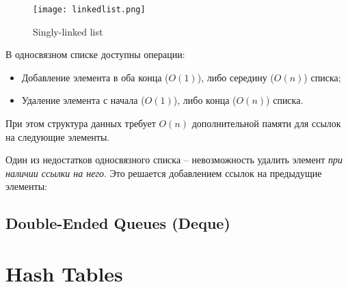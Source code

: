 \begin{figure}[!ht]
\centering
\texttt{[image: linkedlist.png]}
\caption{Singly-linked list}
\end{figure}

В односвязном списке доступны операции:
\begin{itemize}
  \item Добавление элемента в оба конца ($O(1)$), либо середину ($O(n)$) списка;
  \item Удаление элемента с начала ($O(1)$), либо конца ($O(n)$) списка.
\end{itemize}

При этом структура данных требует $O(n)$ дополнительной памяти для ссылок на следующие элементы.

Один из недостатков односвязного списка -- невозможность удалить элемент {\em при наличии ссылки на него}. Это решается добавлением ссылок на предыдущие элементы:

\subsection*{Double-Ended Queues (Deque)}




\section{Hash Tables}

